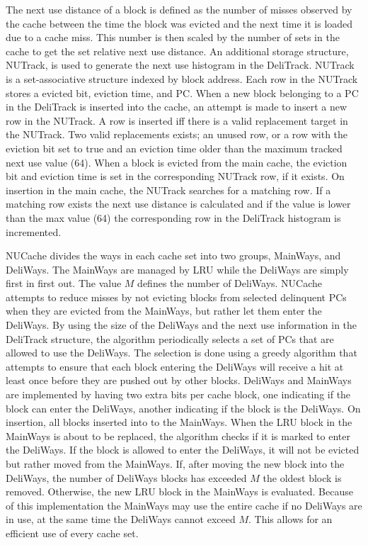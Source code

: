 The next use distance of a block is defined as the number of misses observed by the cache between the time the block was evicted and the next time it is loaded due to a cache miss.
This number is then scaled by the number of sets in the cache to get the set relative next use distance.
An additional storage structure, NUTrack, is used to generate the next use histogram in the DeliTrack.
NUTrack is a set-associative structure indexed by block address.
Each row in the NUTrack stores a evicted bit, eviction time, and PC.
When a new block belonging to a PC in the DeliTrack is inserted into the cache, an attempt is made to insert a new row in the NUTrack. 
A row is inserted iff there is a valid replacement target in the NUTrack.
Two valid replacements exists; an unused row, or a row with the eviction bit set to true and an eviction time older than the maximum tracked next use value (64).
When a block is evicted from the main cache, the eviction bit and eviction time is set in the corresponding NUTrack row, if it exists.
On insertion in the main cache, the NUTrack searches for a matching row. 
If a matching row exists the next use distance is calculated and if the value is lower than the max value (64) the corresponding row in the DeliTrack histogram is incremented.

NUCache divides the ways in each cache set into two groups, MainWays, and DeliWays.
The MainWays are managed by LRU while the DeliWays are simply first in first out.
The value $M$ defines the number of DeliWays.
NUCache attempts to reduce misses by not evicting blocks from selected delinquent PCs when they are evicted from the MainWays, but rather let them enter the DeliWays.
By using the size of the DeliWays and the next use information in the DeliTrack structure, the algorithm periodically selects a set of PCs that are allowed to use the DeliWays.
The selection is done using a greedy algorithm that attempts to ensure that each block entering the DeliWays will receive a hit at least once before they are pushed out by other blocks.
DeliWays and MainWays are implemented by having two extra bits per cache block, one indicating if the block can enter the DeliWays, another indicating if the block is the DeliWays.
On insertion, all blocks inserted into to the MainWays.
When the LRU block in the MainWays is about to be replaced, the algorithm checks if it is marked to enter the DeliWays.
If the block is allowed to enter the DeliWays, it will not be evicted but rather moved from the MainWays.
If, after moving the new block into the DeliWays, the number of DeliWays blocks has exceeded $M$ the oldest block is removed.
Otherwise, the new LRU block in the MainWays is evaluated.
Because of this implementation the MainWays may use the entire cache if no DeliWays are in use, at the same time the DeliWays cannot exceed $M$.
This allows for an efficient use of every cache set.

